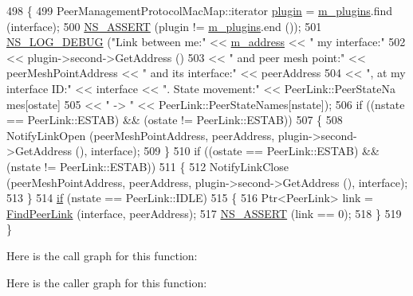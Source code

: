 \begin{DoxyCode}
498 \{
499   PeerManagementProtocolMacMap::iterator \hyperlink{visualizer-ideas_8txt_a82212ee380150b652f4dad598413d06f}{plugin} = \hyperlink{classns3_1_1dot11s_1_1PeerManagementProtocol_a9000d20f6feb3db279a020b237f49d64}{m\_plugins}.find (interface);
500   \hyperlink{assert_8h_a6dccdb0de9b252f60088ce281c49d052}{NS\_ASSERT} (plugin != \hyperlink{classns3_1_1dot11s_1_1PeerManagementProtocol_a9000d20f6feb3db279a020b237f49d64}{m\_plugins}.end ());
501   \hyperlink{group__logging_ga413f1886406d49f59a6a0a89b77b4d0a}{NS\_LOG\_DEBUG} (\textcolor{stringliteral}{"Link between me:"} << \hyperlink{classns3_1_1dot11s_1_1PeerManagementProtocol_abe566c402f630f4df83bdeb2e84a1343}{m\_address} << \textcolor{stringliteral}{" my interface:"} 
502                     << plugin->second->GetAddress ()
503                     << \textcolor{stringliteral}{" and peer mesh point:"} << peerMeshPointAddress << \textcolor{stringliteral}{" and its interface:"} << 
      peerAddress
504                     << \textcolor{stringliteral}{", at my interface ID:"} << \textcolor{keyword}{interface }<< ". State movement:" << PeerLink::PeerStateNa
      mes[ostate] 
505                     << " -> " << PeerLink::PeerStateNames[nstate]);
506   if ((nstate == PeerLink::ESTAB) && (ostate != PeerLink::ESTAB))
507     \{
508       NotifyLinkOpen (peerMeshPointAddress, peerAddress, plugin->second->GetAddress (), interface);
509     \}
510   if ((ostate == PeerLink::ESTAB) && (nstate != PeerLink::ESTAB))
511     \{
512       NotifyLinkClose (peerMeshPointAddress, peerAddress, plugin->second->GetAddress (), interface);
513     \}
514   \hyperlink{loss__ITU1238_8m_a419d895abe1313c35fa353c93802647e}{if} (nstate == PeerLink::IDLE)
515     \{
516       Ptr<PeerLink> link = \hyperlink{classns3_1_1dot11s_1_1PeerManagementProtocol_adc13cd9c290c7098d598af016b606133}{FindPeerLink} (interface, peerAddress);
517       \hyperlink{assert_8h_a6dccdb0de9b252f60088ce281c49d052}{NS\_ASSERT} (link == 0);
518     \}
519 \}
\end{DoxyCode}


Here is the call graph for this function\+:




Here is the caller graph for this function\+:


